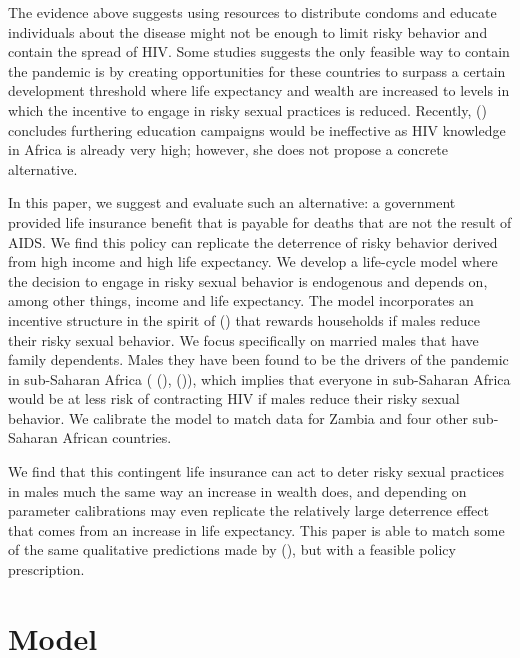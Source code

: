 \documentclass[12pt]{article}
\newcommand{\citee}[1]{\citename{#1} (\citeyear{#1})}
\begin{document}
The evidence above suggests using resources to distribute condoms and educate individuals about the disease might not be enough to limit risky behavior and contain the spread of HIV.  Some studies suggests the only feasible way to contain the pandemic is by creating opportunities for these countries to surpass a certain development threshold where life expectancy and wealth are increased to levels in which the incentive to engage in risky sexual practices is reduced.  Recently, \citee{eo2009} concludes furthering education campaigns would be ineffective as HIV knowledge in Africa is already very high; however, she does not propose a concrete alternative.

In this paper, we suggest and evaluate such an alternative: a government provided life insurance benefit that is payable for deaths that are not the result of AIDS.  We find this policy can replicate the deterrence of risky behavior derived from high income and high life expectancy.  We develop a life-cycle model where the decision to engage in risky sexual behavior is endogenous and depends on, among other things, income and life expectancy.  The model incorporates an incentive structure in the spirit of \citee{HO2010} that rewards households if males reduce their risky sexual behavior.  We focus specifically on married males that have family dependents.  Males they have been found to be the drivers of the pandemic in sub-Saharan Africa (\citee{Ulin1992}, \citee{HE2007}), which implies that everyone in sub-Saharan Africa would be at less risk of contracting HIV if males reduce their risky sexual behavior.  We calibrate the model to match data for Zambia and four other sub-Saharan African countries.

We find that this contingent life insurance can act to deter risky sexual practices in males much the same way an increase in wealth does, and depending on parameter calibrations may even replicate the relatively large deterrence effect that comes from an increase in life expectancy.  This paper is able to match some of the same qualitative predictions made by \citee{eoQJE}, but with a feasible policy prescription.  

\section{Model}\label{s:model}
\end{document}
